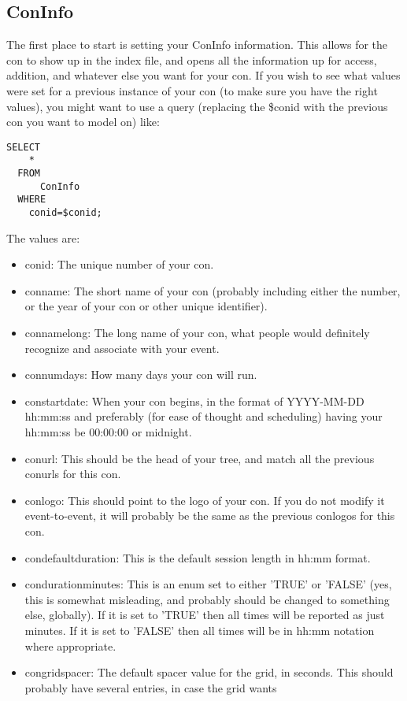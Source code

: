 \documentclass[captions=tablesignature]{scrartcl}
\begin{document}
\subsection{ConInfo}
\label{sec-10-1}
The first place to start is setting your ConInfo information.  This
allows for the con to show up in the index file, and opens all the
information up for access, addition, and whatever else you want for
your con.  If you wish to see what values were set for a previous
instance of your con (to make sure you have the right values), you
might want to use a query (replacing the \$conid with the previous
con you want to model on) like:
\begin{verbatim}
SELECT
    *
  FROM
      ConInfo
  WHERE
    conid=$conid;
\end{verbatim}
The values are:
\begin{itemize}
\item conid: The unique number of your con.
\item conname: The short name of your con (probably including either
the number, or the year of your con or other unique identifier).
\item connamelong: The long name of your con, what people would
definitely recognize and associate with your event.
\item connumdays: How many days your con will run.
\item constartdate: When your con begins, in the format of YYYY-MM-DD
hh:mm:ss and preferably (for ease of thought and scheduling)
having your hh:mm:ss be 00:00:00 or midnight.
\item conurl: This should be the head of your tree, and match all the
previous conurls for this con.
\item conlogo: This should point to the logo of your con.  If you do
not modify it event-to-event, it will probably be the same as the
previous conlogos for this con.
\item condefaultduration: This is the default session length in hh:mm
format.
\item condurationminutes: This is an enum set to either 'TRUE' or
'FALSE' (yes, this is somewhat misleading, and probably should be
changed to something else, globally).  If it is set to 'TRUE'
then all times will be reported as just minutes.  If it is set to
'FALSE' then all times will be in hh:mm notation where
appropriate.
\item congridspacer: The default spacer value for the grid, in seconds.
This should probably have several entries, in case the grid wants

\end{itemize}
\end{document}
